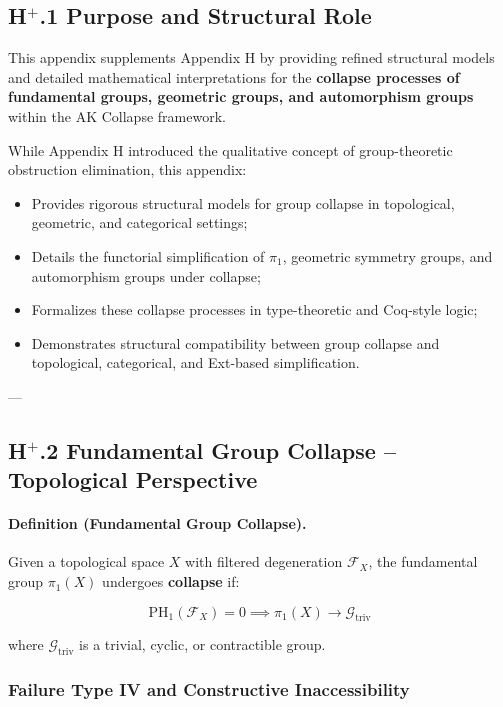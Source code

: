 \documentclass[11pt]{article}
\begin{document}
\subsection*{H$^{+}$.1 Purpose and Structural Role}

This appendix supplements Appendix H by providing refined structural models and detailed mathematical interpretations for the \textbf{collapse processes of fundamental groups, geometric groups, and automorphism groups} within the AK Collapse framework.

While Appendix H introduced the qualitative concept of group-theoretic obstruction elimination, this appendix:

\begin{itemize}
    \item Provides rigorous structural models for group collapse in topological, geometric, and categorical settings;
    \item Details the functorial simplification of $\pi_1$, geometric symmetry groups, and automorphism groups under collapse;
    \item Formalizes these collapse processes in type-theoretic and Coq-style logic;
    \item Demonstrates structural compatibility between group collapse and topological, categorical, and Ext-based simplification.
\end{itemize}

---

\subsection*{H$^{+}$.2 Fundamental Group Collapse – Topological Perspective}

\paragraph{Definition (Fundamental Group Collapse).}

Given a topological space $X$ with filtered degeneration $\mathcal{F}_X$, the fundamental group $\pi_1(X)$ undergoes \textbf{collapse} if:

\[
\mathrm{PH}_1(\mathcal{F}_X) = 0 \implies \pi_1(X) \longrightarrow \mathcal{G}_{\mathrm{triv}}
\]

where $\mathcal{G}_{\mathrm{triv}}$ is a trivial, cyclic, or contractible group.

\subsubsection*{Failure Type IV and Constructive Inaccessibility}
\end{document}
